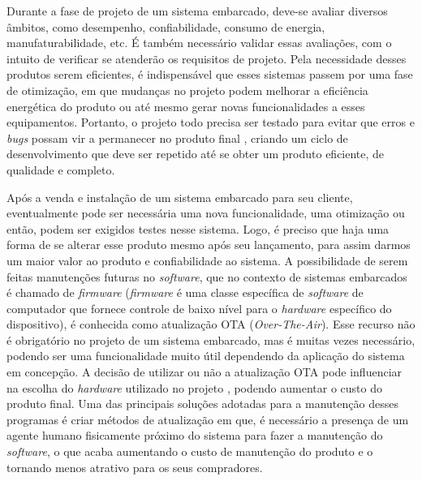 

Durante a fase de projeto de um sistema embarcado, deve-se avaliar diversos âmbitos, como desempenho, confiabilidade, consumo de energia, manufaturabilidade, etc. É também necessário validar essas avaliações, com o intuito de verificar se atenderão os requisitos de projeto. Pela necessidade desses produtos serem eficientes, é indispensável que esses sistemas passem por uma fase de otimização, em que mudanças no projeto podem melhorar a eficiência energética do produto ou até mesmo gerar novas funcionalidades a esses equipamentos. Portanto, o projeto todo precisa ser testado para evitar que erros e \textit{bugs} possam vir a permanecer no produto final \cite{Marwedel2006}, criando um ciclo de desenvolvimento que deve ser repetido até se obter um produto eficiente, de qualidade e completo.

Após a venda e instalação de um sistema embarcado para seu cliente, eventualmente pode ser necessária uma nova funcionalidade, uma otimização ou então, podem ser exigidos testes nesse sistema. Logo, é preciso que haja uma forma de se alterar esse produto mesmo após seu lançamento, para assim darmos um maior valor ao produto e confiabilidade ao sistema.
A possibilidade de serem feitas manutenções futuras no \textit{software}, que no contexto de sistemas embarcados é chamado de \textit{firmware} (\textit{firmware} é uma classe específica de \textit{software} de computador que fornece controle de baixo nível para o \textit{hardware} específico do dispositivo), é conhecida como atualização OTA (\textit{Over-The-Air}). Esse recurso não é obrigatório no projeto de um sistema embarcado, mas é muitas vezes necessário, podendo ser uma funcionalidade muito útil dependendo da aplicação do sistema em concepção. A decisão de utilizar ou não a atualização OTA pode influenciar na escolha do \textit{hardware} utilizado no projeto \cite{Ball2002}, 
podendo aumentar o custo do produto final.
Uma das principais soluções adotadas para a manutenção desses programas é criar métodos de atualização em que, é necessário a presença de um agente humano fisicamente próximo do sistema para fazer a manutenção do \textit{software}, o que acaba aumentando o custo de manutenção do produto e o tornando menos atrativo para os seus compradores.

